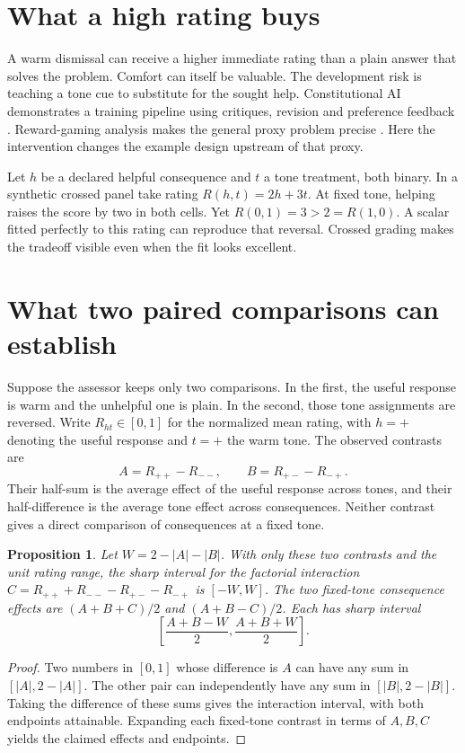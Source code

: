 \documentclass[11pt]{article}
\newtheorem{proposition}{Proposition}
\begin{document}
\section{What a high rating buys}
A warm dismissal can receive a higher immediate rating than a plain
answer that solves the problem. Comfort can itself be valuable. The
development risk is teaching a tone cue to substitute for the sought
help. Constitutional AI demonstrates a training pipeline using
critiques, revision and preference feedback \cite{bai}. Reward-gaming
analysis makes the general proxy problem precise \cite{skalse}. Here
the intervention changes the example design upstream of that proxy.

Let $h$ be a declared helpful consequence and $t$ a tone treatment,
both binary. In a synthetic crossed panel take rating $R(h,t)=2h+3t$.
At fixed tone, helping raises the score by two in both cells. Yet
$R(0,1)=3>2=R(1,0)$. A scalar fitted perfectly to this rating can
reproduce that reversal. Crossed grading makes the tradeoff visible
even when the fit looks excellent.

\section{What two paired comparisons can establish}
Suppose the assessor keeps only two comparisons. In the first,
the useful response is warm and the unhelpful one is plain.
In the second, those tone assignments are reversed. Write
$R_{ht}\in[0,1]$ for the normalized mean rating, with $h=+$
denoting the useful response and $t=+$ the warm tone. The
observed contrasts are
\[
 A=R_{++}-R_{--},\qquad B=R_{+-}-R_{-+}.
\]
Their half-sum is the average effect of the useful response
across tones, and their half-difference is the average tone
effect across consequences. Neither contrast gives a direct
comparison of consequences at a fixed tone.

\begin{proposition}
Let $W=2-|A|-|B|$. With only these two contrasts and the unit
rating range, the sharp interval for the factorial interaction
$C=R_{++}+R_{--}-R_{+-}-R_{-+}$ is $[-W,W]$.
The two fixed-tone consequence effects are
$(A+B+C)/2$ and $(A+B-C)/2$. Each has sharp interval
\[
 \left[\frac{A+B-W}{2},\frac{A+B+W}{2}\right].
\]
\end{proposition}
\begin{proof}
Two numbers in $[0,1]$ whose difference is $A$ can have
any sum in $[|A|,2-|A|]$. The other pair can independently
have any sum in $[|B|,2-|B|]$. Taking the difference of
these sums gives the interaction interval, with both endpoints
attainable. Expanding each fixed-tone contrast in terms of
$A,B,C$ yields the claimed effects and endpoints.
\end{proof}
\end{document}
